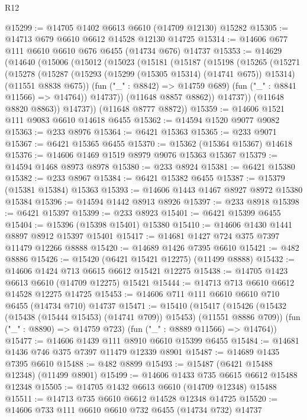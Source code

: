 \begin{lexlean}{R12}
\begin{coremodule}
{{{{{{{{{{{{{{{{{{{{{{{{{{{{{{{{{{{{{{{{{{{{{{{{{{{{{{{{{{{{{{{{{{{{{{{{{{{{{{{{{{@15299 := @14705 @1402 @6613 @6610 (@14709 @12130) @15282
@15305 := @14713 @679 @6610 @6612 @14528 @12130 @14725
@15314 := @14606 @677 @111 @6610 @6610 @676 @6455 (@14734 @676) @14737
@15353 := @14629
    (@14640
      (@15006
        (@15012
          (@15023
            (@15181
              (@15187
                (@15198
                  (@15265
                    (@15271
                      (@15278
                        (@15287
                          (@15293 (@15299 (@15305 @15314) (@14741 @675)) @15314)
                          (@11551 @8838 @675))
                        (fun ("_" : @8842) => @14759 @689)
                        (fun ("_" : @8841 @11566) => @14764))
                      @14737))
                  (@11648 @8857 @8862))
                @14737))
            (@11648 @8820 @8863))
          @14737))
      (@11648 @8777 @8872))
@15359 := @14606 @1521 @111 @9083 @6610 @14618 @6455
@15362 := @14594 @1520 @9077 @9082
@15363 := @233 @8976
@15364 := @6421 @15363
@15365 := @233 @9071
@15367 := @6421 @15365 @6455
@15370 := @15362 (@15364 @15367) @14618
@15376 := @14606 @1469 @1519 @8979 @9076 @15363 @15367
@15379 := @14594 @1468 @8973 @8978
@15380 := @233 @8924
@15381 := @6421 @15380
@15382 := @233 @8967
@15384 := @6421 @15382 @6455
@15387 := @15379 (@15381 @15384) @15363
@15393 := @14606 @1443 @1467 @8927 @8972 @15380 @15384
@15396 := @14594 @1442 @8913 @8926
@15397 := @233 @8918
@15398 := @6421 @15397
@15399 := @233 @8923
@15401 := @6421 @15399 @6455
@15404 := @15396 (@15398 @15401) @15380
@15410 := @14606 @1430 @1441 @8897 @8912 @15397 @15401
@15417 := @14681 @1427 @724 @375 @7397 @11479 @12266 @8888
@15420 := @14689 @1426 @7395 @6610
@15421 := @482 @8886
@15426 := @15420 (@6421 @15421 @12275) (@11499 @8888)
@15432 := @14606 @1424 @713 @6615 @6612 @15421 @12275
@15438 := @14705 @1423 @6613 @6610 (@14709 @12275) @15421
@15444 := @14713 @713 @6610 @6612 @14528 @12275 @14725
@15453 := @14606 @711 @111 @6610 @6610 @710 @6455 (@14734 @710) @14737
@15471 := @15410
    (@15417
      (@15426 (@15432 (@15438 (@15444 @15453) (@14741 @709)) @15453) (@11551 @8886 @709))
      (fun ("_" : @8890) => @14759 @723)
      (fun ("_" : @8889 @11566) => @14764))
@15477 := @14606 @1439 @111 @8910 @6610 @15399 @6455
@15484 := @14681 @1436 @746 @375 @7397 @11479 @12339 @8901
@15487 := @14689 @1435 @7395 @6610
@15488 := @482 @8899
@15493 := @15487 (@6421 @15488 @12348) (@11499 @8901)
@15499 := @14606 @1433 @735 @6615 @6612 @15488 @12348
@15505 := @14705 @1432 @6613 @6610 (@14709 @12348) @15488
@15511 := @14713 @735 @6610 @6612 @14528 @12348 @14725
@15520 := @14606 @733 @111 @6610 @6610 @732 @6455 (@14734 @732) @14737
}}}}}}}}}}}}}}}}}}}}}}}}}}}}}}}}}}}}}}}}}}}}}}}}}}}}}}}}}}}}}}}}}}}}}}}}}}}}}}}}}}
\end{coremodule}
\end{lexlean}
